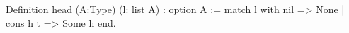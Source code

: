 Definition head (A:Type) (l: list A) : option A :=
  match l with
     nil       => None
  | cons h t => Some h
  end.